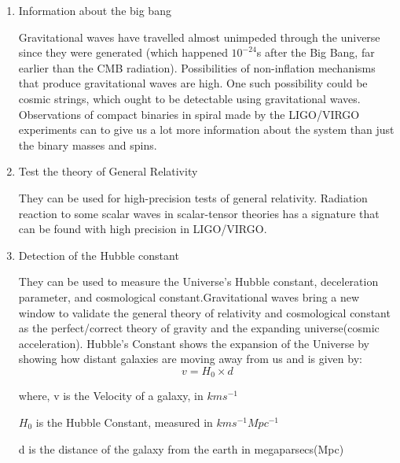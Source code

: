 \begin{enumerate}
    \item Information about the big bang 
    
    \hspace{1cm}Gravitational waves have travelled almost unimpeded through the universe since they were generated (which happened $10^{-24}$s after the Big Bang, far earlier than the CMB radiation). Possibilities of non-inflation mechanisms that produce gravitational waves are high. One such possibility could be cosmic strings, which ought to be detectable using gravitational waves. Observations of compact binaries in spiral made by the LIGO/VIRGO experiments can to give us a lot more information about the system than just the binary masses and spins.\\
    

    \item Test the theory of General Relativity
    
    \hspace{1cm}They can be used for high-precision tests of general relativity. Radiation reaction to some scalar waves in scalar-tensor theories has a signature that can be found with high precision in LIGO/VIRGO.\\
    

    \item Detection of the Hubble constant
    
    \hspace{1cm}They can be used to measure the Universe’s Hubble constant, deceleration parameter, and cosmological constant.Gravitational waves bring a new window to validate the general theory of relativity and cosmological constant as the perfect/correct theory of gravity and the expanding universe(cosmic acceleration). Hubble's Constant shows the expansion of the Universe by showing how distant galaxies are moving away from us and is given by:
    \begin{equation}
        v = H_0 \times d
        \end{equation}
        
        where, v is the Velocity of a galaxy, in $kms^{-1}$
        
              $H_{0}$ is the Hubble Constant, measured in $kms^{-1}Mpc^{-1}$
              
              d is the distance of the galaxy from the earth in megaparsecs(Mpc)
        
        \vspace{1cm}
        

\end{enumerate}
